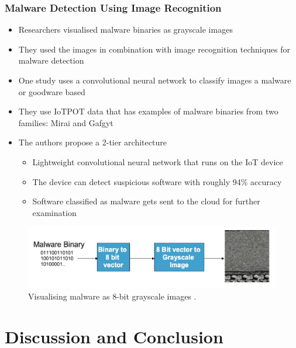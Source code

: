 \documentclass[10pt, presentation]{beamer}
\begin{document}
    \begin{frame}
        \frametitle{Malware Detection Using Image Recognition}
        \begin{itemize}
            \item Researchers visualised malware binaries as grayscale images \cite{article:3}
            \item They used the images in combination with image recognition techniques for malware detection
            \item One study uses a convolutional neural network to classify images a malware or goodware based
            \item They use IoTPOT \cite{IoTPOT} data that has examples of malware binaries from two families: Mirai and Gafgyt
            \item The authors propose a 2-tier architecture
            \begin{itemize}
                \item Lightweight convolutional neural network that runs on the IoT device
                \item The device can detect suspicious software with roughly 94\% accuracy
                \item Software classified as malware gets sent to the cloud for further examination
            \end{itemize}
        \end{itemize}
        \begin{figure}
            \centerline{\includegraphics[width=\linewidth,height=0.25\textheight,keepaspectratio]{figures/malware-to-gray.png}}
            \caption{Visualising malware as 8-bit grayscale images \cite{article:7}.}
        \end{figure}

    \end{frame}


    \section{Discussion and Conclusion}
\end{document}
